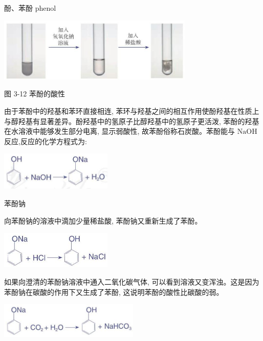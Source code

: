\documentclass[10pt]{article}
\begin{document}
\begin{mdframed}

酚、苯酚 phenol

\end{mdframed}

\begin{center}
\includegraphics[max width=0.7\textwidth]{images/0190efc5-b58a-7c43-bfb0-e0a030df9cfd_69_840197.jpg}
\end{center}

图 3-12 苯酚的酸性

由于苯酚中的羟基和苯环直接相连, 苯环与羟基之间的相互作用使酚羟基在性质上与醇羟基有显著差异。酚羟基中的氢原子比醇羟基中的氢原子更活泼, 苯酚的羟基在水溶液中能够发生部分电离, 显示弱酸性, 故苯酚俗称石炭酸。苯酚能与 \(\mathrm{{NaOH}}\) 反应,反应的化学方程式为:

\begin{center}
\includegraphics[max width=0.4\textwidth]{images/0190efc5-b58a-7c43-bfb0-e0a030df9cfd_69_193072.jpg}
\end{center}

苯酚钠

向苯酚钠的溶液中滴加少量稀盐酸, 苯酚钠又重新生成了苯酚。

\begin{center}
\includegraphics[max width=0.4\textwidth]{images/0190efc5-b58a-7c43-bfb0-e0a030df9cfd_69_106750.jpg}
\end{center}

如果向澄清的苯酚钠溶液中通入二氧化碳气体, 可以看到溶液又变浑浊。这是因为苯酚钠在碳酸的作用下又生成了苯酚, 这说明苯酚的酸性比碳酸的弱。

\begin{center}
\includegraphics[max width=0.5\textwidth]{images/0190efc5-b58a-7c43-bfb0-e0a030df9cfd_70_171511.jpg}
\end{center}
\end{document}
